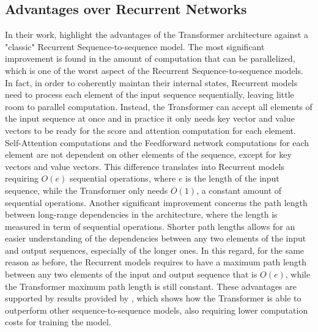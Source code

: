         \subsection{Advantages over Recurrent Networks}
        \label{selfan:adv_recur}
            In their work,  highlight the advantages of the Transformer architecture against a "classic" Recurrent Sequence-to-sequence model. \newline
            The most significant improvement is found in the amount of computation that can be parallelized, which is one of the worst aspect of the Recurrent Sequence-to-sequence models. In fact, in order to coherently maintan their internal states, Recurrent models need to process each element of the input sequence sequentially, leaving little room to parallel computation. Instead, the Transformer can accept all elements of the input sequence at once and in practice it only needs key vector and value vectors to be ready for the score and attention computation for each element. Self-Attention computations and the Feedforward network computations for each element are not dependent on other elements of the sequence, except for key vectors and value vectors. This difference translates into Recurrent models requiring $O\left(e\right)$ sequential operations, where $e$ is the length of the input sequence, while the Transformer only needs $O(1)$, a constant amount of sequential operations. \newline
            Another significant improvement concerns the path length between long-range dependencies in the architecture, where the length is measured in term of sequential operations. Shorter path lengths allows for an easier understanding of the dependencies between any two elements of the input and output sequences, especially of the longer ones. In this regard, for the same reason as before, the Recurrent models requires to have a maximum path length between any two elements of the input and output sequence that is $O\left(e\right)$, while the Transformer maximum path length is still constant. \newline
            These advantages are supported by results provided by , which shows how the Transformer is able to outperform other sequence-to-sequence models, also requiring lower computation costs for training the model.
    
    \newpage
